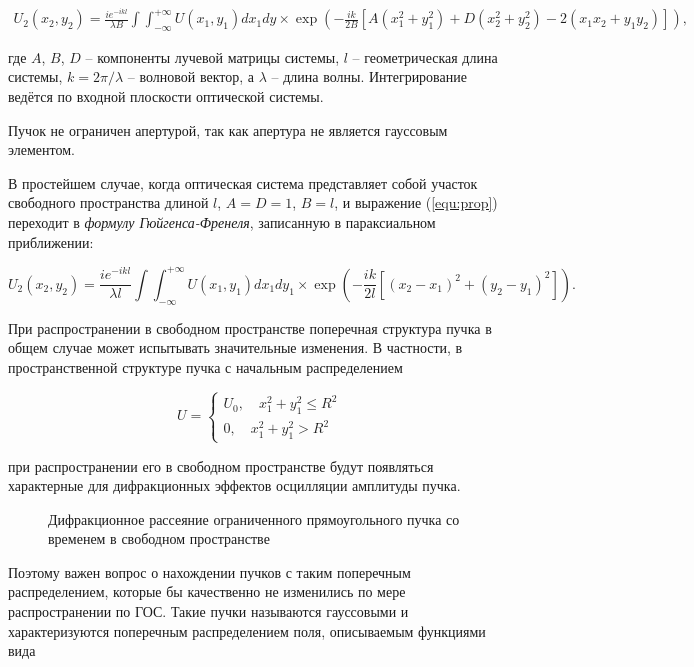 \documentclass[a4paper,12pt]{article}
\begin{document}
\begin{multline}
    U_2 (x_2, y_2) = \frac{ie^{-ikl}}{\lambda B} \int\int_{-\infty}^{+\infty}U(x_1,y_1)dx_1 dy\times
    \exp{(-\frac{ik}{2B}[A(x_1^2+y_1^2)+D(x_2^2+y_2^2)-2(x_1 x_2 + y_1 y_2)])},
    \label{equ:prop}
\end{multline}

где $A$, $B$, $D$ -- компоненты лучевой матрицы системы, $l$ -- геометрическая длина системы, $k = 2\pi/\lambda$ -- волновой вектор, а $\lambda$ -- длина волны. Интегрирование ведётся по входной плоскости оптической системы.

Пучок не ограничен апертурой, так как апертура не является гауссовым элементом.

В простейшем случае, когда оптическая система представляет собой участок свободного пространства длиной $l$, $A = D = 1$, $B = l$, и выражение (\ref{equ:prop}) переходит в \textit{формулу Гюйгенса-Френеля}, записанную в параксиальном приближении:

\begin{equation}
    U_2 (x_2, y_2) = \frac{ie^{-ikl}}{\lambda l}\int\int_{-\infty}^{+\infty}U(x_1,y_1)dx_1 dy_1\times
    \exp{(-\frac{ik}{2l}[(x_2 - x_1)^2 + (y_2 - y_1)^2])}.
\end{equation}

При распространении в свободном пространстве поперечная структура пучка в общем случае может испытывать значительные изменения. В частности, в пространственной структуре пучка с начальным распределением

\begin{equation}
U = 
\begin{cases}
U_0,\quad x_1^2 + y_1^2 \leq R^2\\
0,\quad x_1^2 + y_1^2 > R^2
\end{cases}
\end{equation}

при распространении его в свободном пространстве будут появляться характерные для дифракционных эффектов осцилляции амплитуды пучка.

\begin{figure}[h!]
    \caption{Дифракционное рассеяние ограниченного прямоугольного пучка со временем в свободном пространстве}
    \label{fig:difraction}
\end{figure}

Поэтому важен вопрос о нахождении пучков с таким поперечным распределением, которые бы качественно не изменились по мере распространении по ГОС. Такие пучки называются гауссовыми и характеризуются поперечным распределением поля, описываемым функциями вида 
\end{document}
